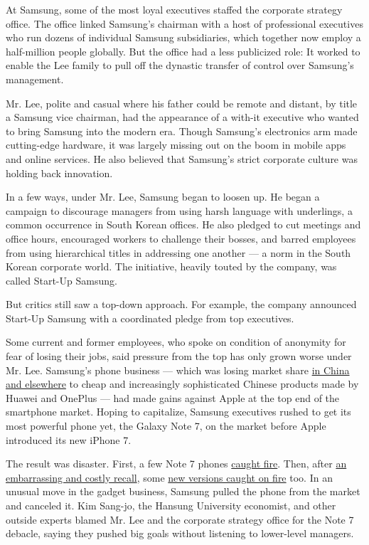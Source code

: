 At Samsung, some of the most loyal executives staffed the corporate
strategy office. The office linked Samsung's chairman with a host of
professional executives who run dozens of individual Samsung
subsidiaries, which together now employ a half-million people globally.
But the office had a less publicized role: It worked to enable the Lee
family to pull off the dynastic transfer of control over Samsung's
management.

Mr. Lee, polite and casual where his father could be remote and distant,
by title a Samsung vice chairman, had the appearance of a with-it
executive who wanted to bring Samsung into the modern era. Though
Samsung's electronics arm made cutting-edge hardware, it was largely
missing out on the boom in mobile apps and online services. He also
believed that Samsung's strict corporate culture was holding back
innovation.

In a few ways, under Mr. Lee, Samsung began to loosen up. He began a
campaign to discourage managers from using harsh language with
underlings, a common occurrence in South Korean offices. He also pledged
to cut meetings and office hours, encouraged workers to challenge their
bosses, and barred employees from using hierarchical titles in
addressing one another --- a norm in the South Korean corporate world.
The initiative, heavily touted by the company, was called Start-Up
Samsung.

But critics still saw a top-down approach. For example, the company
announced Start-Up Samsung with a coordinated pledge from top
executives.

Some current and former employees, who spoke on condition of anonymity
for fear of losing their jobs, said pressure from the top has only grown
worse under Mr. Lee. Samsung's phone business --- which was losing
market share
\href{https://www.nytimes3xbfgragh.onion/2015/04/02/technology/personaltech/with-galaxy-s6-and-s6-edge-samsung-tries-to-regain-its-footing.html}{in
China and elsewhere} to cheap and increasingly sophisticated Chinese
products made by Huawei and OnePlus --- had made gains against Apple at
the top end of the smartphone market. Hoping to capitalize, Samsung
executives rushed to get its most powerful phone yet, the Galaxy Note 7,
on the market before Apple introduced its new iPhone 7.

The result was disaster. First, a few Note 7 phones
\href{https://www.nytimes3xbfgragh.onion/2016/09/10/technology/samsung-galaxy-consumer-product-safety.html}{caught
fire}. Then, after
\href{https://www.nytimes3xbfgragh.onion/2016/09/03/business/samsung-galaxy-note-battery.html}{an
embarrassing and costly recall}, some
\href{https://www.nytimes3xbfgragh.onion/2016/10/11/business/samsung-galaxy-note-fires.html}{new
versions caught on fire} too. In an unusual move in the gadget business,
Samsung pulled the phone from the market and canceled it. Kim Sang-jo,
the Hansung University economist, and other outside experts blamed Mr.
Lee and the corporate strategy office for the Note 7 debacle, saying
they pushed big goals without listening to lower-level managers.

